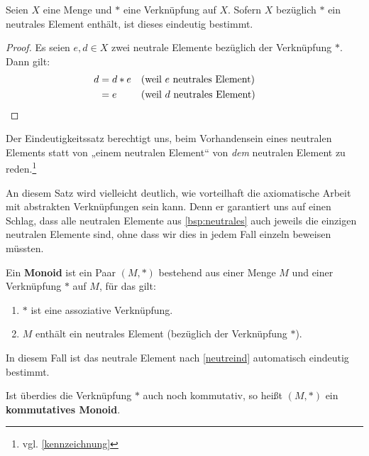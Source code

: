 \begin{satz} \label{neutreind}
    Seien $X$ eine Menge und $*$ eine Verknüpfung auf $X$. Sofern $X$ bezüglich $*$ ein neutrales Element enthält, ist dieses eindeutig bestimmt.
\end{satz}
\begin{proof}
    Es seien $e,d\in X$ zwei neutrale Elemente bezüglich der Verknüpfung $*$. Dann gilt:
    \begin{align*}
        d & = d*e && (\text{weil $e$ neutrales Element}) \\
        & = e && (\text{weil $d$ neutrales Element}) && \qedhere
    \end{align*}
\end{proof}


\begin{bem}
    Der Eindeutigkeitssatz berechtigt uns, beim Vorhandensein eines neutralen Elements statt von „einem neutralen Element“ von \emph{dem} neutralen Element zu reden.\footnote{vgl. \cref{kennzeichnung}}
    
    An diesem Satz wird vielleicht deutlich, wie vorteilhaft die axiomatische Arbeit mit abstrakten Verknüpfungen sein kann. Denn er garantiert uns auf einen Schlag, dass alle neutralen Elemente aus \cref{bsp:neutrales} auch jeweils die einzigen neutralen Elemente sind, ohne dass wir dies in jedem Fall einzeln beweisen müssten.
\end{bem}


\begin{defin}[Monoid] 
    Ein \textbf{Monoid} ist ein Paar $(M,*)$ bestehend aus einer Menge $M$ und einer Verknüpfung $*$ auf $M$, für das gilt:
    \begin{enumerate}[(M1), labelindent=1.5em, leftmargin=*]
        \item $*$ ist eine assoziative Verknüpfung.
        \item $M$ enthält ein neutrales Element (bezüglich der Verknüpfung $*$).
    \end{enumerate}
    In diesem Fall ist das neutrale Element nach \cref{neutreind} automatisch eindeutig bestimmt.
    
    Ist überdies die Verknüpfung $*$ auch noch kommutativ, so heißt $(M,*)$ ein \textbf{kommutatives Monoid}.
\end{defin}


